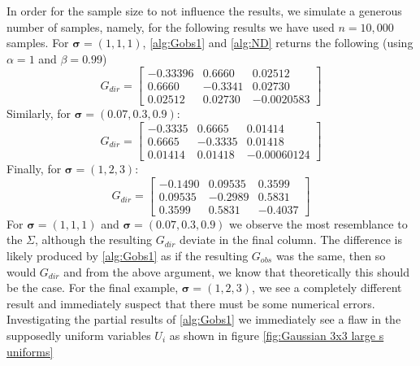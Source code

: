 \documentclass[../Thesis.tex]{subfiles}
\begin{document}
In order for the sample size to not influence the results, we simulate a generous number of samples, namely, for the following results we have used $n = 10{,}000$ samples. For $\boldsymbol\sigma = (1,1,1)$, \autoref{alg:Gobs1} and \autoref{alg:ND} returns the following (using $\alpha = 1$ and $\beta = 0.99$)
\begin{equation} \label{eq:s medium G_dir}
    G_{dir} =
    \begin{bmatrix}
        -0.33396 & 0.6660  & 0.02512    \\
        0.6660   & -0.3341 & 0.02730    \\
        0.02512  & 0.02730 & -0.0020583
    \end{bmatrix}
\end{equation}
Similarly, for $\boldsymbol\sigma = (0.07, 0.3, 0.9)$:
\begin{equation} \label{eq:s small G_dir}
    G_{dir} =
    \begin{bmatrix}
        -0.3335 & 0.6665  & 0.01414     \\
        0.6665  & -0.3335 & 0.01418     \\
        0.01414 & 0.01418 & -0.00060124
    \end{bmatrix}
\end{equation}
Finally, for $\boldsymbol\sigma = (1,2,3)$:
$$ G_{dir} =
    \begin{bmatrix}
        -0.1490 & 0.09535 & 0.3599  \\
        0.09535 & -0.2989 & 0.5831  \\
        0.3599  & 0.5831  & -0.4037
    \end{bmatrix}
$$
For $\boldsymbol\sigma = (1,1,1)$ and $\boldsymbol\sigma = (0.07, 0.3, 0.9)$ we observe the most resemblance to the $\Sigma$, although the resulting $G_{dir}$ deviate in the final column. The difference is likely produced by \autoref{alg:Gobs1} as if the resulting $G_{obs}$ was the same, then so would $G_{dir}$ and from the above argument, we know that theoretically this should be the case. For the final example, $\boldsymbol\sigma = (1,2,3)$, we see a completely different result and immediately suspect that there must be some numerical errors. Investigating the partial results of \autoref{alg:Gobs1} we immediately see a flaw in the supposedly uniform variables $U_i$ as shown in figure \autoref{fig:Gaussian 3x3 large s uniforms}
\end{document}
